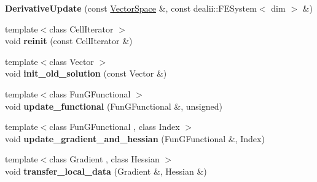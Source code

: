 \begin{DoxyCompactItemize}
\item 
\hypertarget{structSpacy_1_1dealII_1_1Detail_1_1DerivativeUpdate_3_01dim_00_01VariableDims_00_01row_00-1_01_4_aed18ce77df265d1a7437733ac4deb8f1}{{\bfseries \-Derivative\-Update} (const \hyperlink{classSpacy_1_1VectorSpace}{\-Vector\-Space} \&, const dealii\-::\-F\-E\-System$<$ dim $>$ \&)}\label{structSpacy_1_1dealII_1_1Detail_1_1DerivativeUpdate_3_01dim_00_01VariableDims_00_01row_00-1_01_4_aed18ce77df265d1a7437733ac4deb8f1}

\item 
\hypertarget{structSpacy_1_1dealII_1_1Detail_1_1DerivativeUpdate_3_01dim_00_01VariableDims_00_01row_00-1_01_4_a6102b9015e9caeb60892b3e2b6d46025}{{\footnotesize template$<$class Cell\-Iterator $>$ }\\void {\bfseries reinit} (const \-Cell\-Iterator \&)}\label{structSpacy_1_1dealII_1_1Detail_1_1DerivativeUpdate_3_01dim_00_01VariableDims_00_01row_00-1_01_4_a6102b9015e9caeb60892b3e2b6d46025}

\item 
\hypertarget{structSpacy_1_1dealII_1_1Detail_1_1DerivativeUpdate_3_01dim_00_01VariableDims_00_01row_00-1_01_4_a931687ca4f500ea302987e594d5f1fac}{{\footnotesize template$<$class Vector $>$ }\\void {\bfseries init\-\_\-old\-\_\-solution} (const \-Vector \&)}\label{structSpacy_1_1dealII_1_1Detail_1_1DerivativeUpdate_3_01dim_00_01VariableDims_00_01row_00-1_01_4_a931687ca4f500ea302987e594d5f1fac}

\item 
\hypertarget{structSpacy_1_1dealII_1_1Detail_1_1DerivativeUpdate_3_01dim_00_01VariableDims_00_01row_00-1_01_4_a77e300dd367b35bef882fbe8cfef0131}{{\footnotesize template$<$class Fun\-G\-Functional $>$ }\\void {\bfseries update\-\_\-functional} (\-Fun\-G\-Functional \&, unsigned)}\label{structSpacy_1_1dealII_1_1Detail_1_1DerivativeUpdate_3_01dim_00_01VariableDims_00_01row_00-1_01_4_a77e300dd367b35bef882fbe8cfef0131}

\item 
\hypertarget{structSpacy_1_1dealII_1_1Detail_1_1DerivativeUpdate_3_01dim_00_01VariableDims_00_01row_00-1_01_4_a5daf11e6e84c13688f0c8c412583a9d1}{{\footnotesize template$<$class Fun\-G\-Functional , class Index $>$ }\\void {\bfseries update\-\_\-gradient\-\_\-and\-\_\-hessian} (\-Fun\-G\-Functional \&, \-Index)}\label{structSpacy_1_1dealII_1_1Detail_1_1DerivativeUpdate_3_01dim_00_01VariableDims_00_01row_00-1_01_4_a5daf11e6e84c13688f0c8c412583a9d1}

\item 
\hypertarget{structSpacy_1_1dealII_1_1Detail_1_1DerivativeUpdate_3_01dim_00_01VariableDims_00_01row_00-1_01_4_a4d4673237a232cc934eabd585798800e}{{\footnotesize template$<$class Gradient , class Hessian $>$ }\\void {\bfseries transfer\-\_\-local\-\_\-data} (\-Gradient \&, \-Hessian \&)}\label{structSpacy_1_1dealII_1_1Detail_1_1DerivativeUpdate_3_01dim_00_01VariableDims_00_01row_00-1_01_4_a4d4673237a232cc934eabd585798800e}

\end{DoxyCompactItemize}

